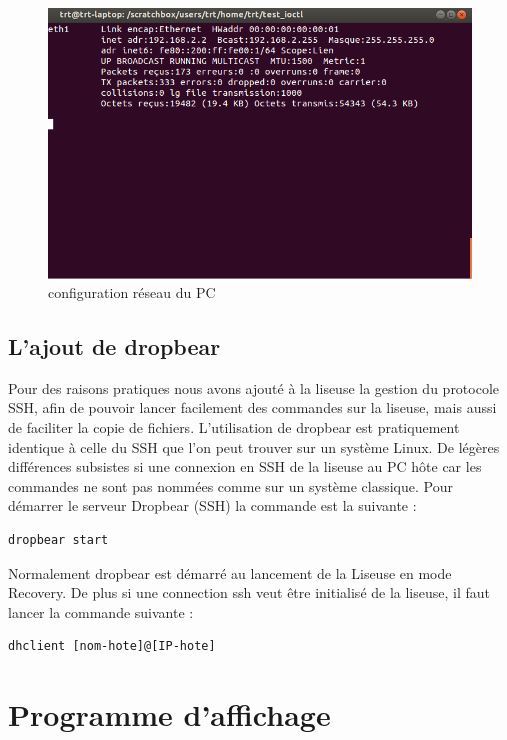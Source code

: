 \begin{figure}[]
	\begin{center}
		\includegraphics[scale=0.5]{capt_pc_ifconfig.png}
	\end{center}
	\caption{configuration réseau du PC}
\end{figure}
\clearpage
\subsection{L'ajout de dropbear}
Pour des raisons pratiques nous avons ajouté à la liseuse la gestion du protocole SSH, afin de pouvoir lancer facilement des commandes sur la liseuse, mais aussi de faciliter la copie de fichiers.
L'utilisation de dropbear est pratiquement identique à celle du SSH que l'on peut trouver sur un système Linux. De légères différences subsistes si une connexion en SSH de la liseuse au PC hôte car les commandes ne sont pas nommées comme sur un système classique. Pour démarrer le serveur Dropbear (SSH) la commande est la suivante : 

\begin{lstlisting}
dropbear start
\end{lstlisting}

Normalement dropbear est démarré au lancement de la Liseuse en mode Recovery. De plus si une connection ssh veut être initialisé de la liseuse, il faut lancer la commande suivante :

\begin{lstlisting}
dhclient [nom-hote]@[IP-hote]
\end{lstlisting}



\section{Programme d'affichage}

